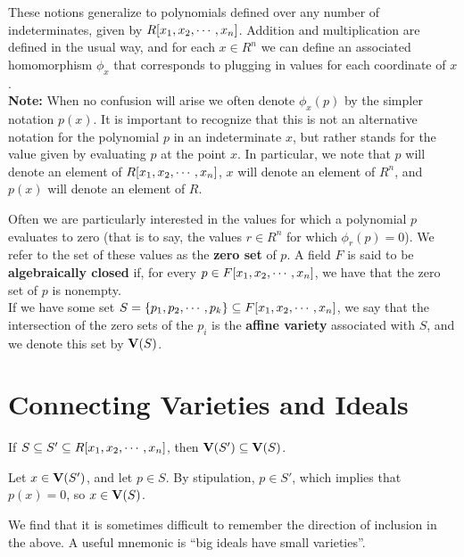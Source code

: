 \documentclass[twoside]{report}
\begin{document}
These notions generalize to polynomials defined over any number of
indeterminates, given by $R[x_1, x_2,\cdots,x_n]$.  Addition and multiplication are
defined in the usual way, and for each $x \in R^n$ we can define an
associated homomorphism $\phi_{x}$ that corresponds to plugging in
values for each coordinate of $x$.\\

\textbf{Note:} When no confusion will arise we often denote
$\phi_x(p)$ by the simpler notation $p(x)$.  It is important to
recognize that this is not an alternative notation for the polynomial
$p$ in an indeterminate $x$, but rather stands for the value given by
evaluating $p$ at the point $x$.  In particular, we note that $p$ will
denote an element of $R[x_1, x_2,\cdots,x_n]$, $x$ will denote an element of $R^n$,
and $p(x)$ will denote an element of $R$.

Often we are particularly interested in the values for which a
polynomial $p$ evaluates to zero (that is to say, the values $r \in
R^n$ for which $\phi_r(p) = 0$).  We refer to the set of these values
as the \textbf{zero set} of $p$.  A field $F$ is said to be
\textbf{algebraically closed} if, for every $p \in F[x_1, x_2,\cdots,x_n]$, we have
that the zero set of $p$ is nonempty.\\

If we have some set $S = \{p_1, p_2,\cdots, p_k\} \subseteq
F[x_1, x_2,\cdots,x_n]$, we say that the intersection of the zero sets of the $p_i$
is the \textbf{affine variety} associated with $S$, and we denote this
set by $\mathbf{V}(S)$.

\section{Connecting Varieties and Ideals}

\begin{lemma} If $S \subseteq S' \subseteq R[x_1, x_2,\cdots,x_n]$, then
  $\mathbf{V}(S') \subseteq \mathbf{V}(S)$.
  
  Let $x \in \mathbf{V}(S')$, and let $p \in S$.  By stipulation, $p \in
  S'$, which implies that $p(x) = 0$, so $x \in \mathbf{V}(S)$.
\end{lemma}

We find that it is sometimes difficult to remember the direction of
inclusion in the above.  A useful mnemonic is ``big ideals have small
varieties''.
\end{document}
